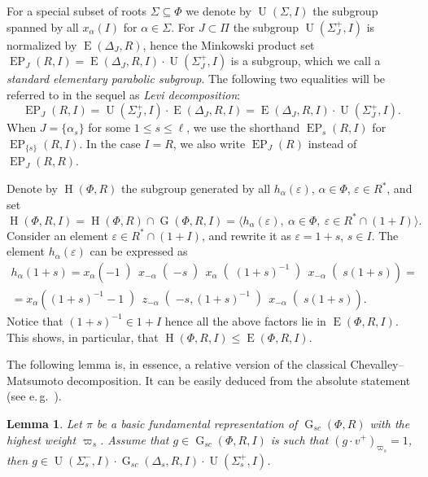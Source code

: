 \documentclass[11pt]{amsart}
\theoremstyle{plain}
\numberwithin{equation}{section}
\newtheorem{lemma}{Lemma}
\numberwithin{lemma}{section}
\theoremstyle{definition}
\theoremstyle{remark}
\DeclareMathOperator{\G}{G}
\DeclareMathOperator{\E}{E}
\DeclareMathOperator{\EP}{EP}
\DeclareMathOperator{\Hh}{H}
\DeclareMathOperator{\U}{U}
\begin{document}
For a special subset of roots $\Sigma\subseteq \Phi$ we denote by $\U(\Sigma, I)$ the subgroup spanned by all $x_{\alpha}(I)$ for $\alpha\in \Sigma$. 
For $J\subset\Pi$ the subgroup $\U(\Sigma_J^+, I)$ is normalized by $\E(\Delta_J, R)$, hence the Minkowski product set $\EP_J(R, I) = \E(\Delta_J, R, I) \cdot \U(\Sigma_J^+, I)$ is a subgroup, which we call a \emph{standard elementary parabolic subgroup}.
The following two equalities will be referred to in the sequel as \emph{Levi decomposition}:
\begin{equation} \label{rel:Levi-decomp} \EP_J(R, I) = \U(\Sigma_J^+, I) \cdot \E(\Delta_J, R, I) = \E(\Delta_J, R, I) \cdot \U(\Sigma_J^+, I). \end{equation}
When $J = \{ \alpha_s \}$ for some $1 \leq s\leq \ell$, we use the shorthand $\EP_s(R, I)$ for $\EP_{\{s\}}(R, I)$.
In the case $I=R$, we also write $\EP_J(R)$ instead of $\EP_J(R, R)$.

Denote by $\Hh(\Phi, R)$ the subgroup generated by all $h_\alpha(\varepsilon)$, $\alpha\in\Phi$, $\varepsilon\in R^*$, and set
\[ \Hh(\Phi, R, I) = \Hh(\Phi, R)\cap\G(\Phi, R, I)=\langle h_\alpha(\varepsilon), \ \alpha\in\Phi, \ \varepsilon\in R^*\cap(1+I)\rangle. \]
Consider an element $\varepsilon\in R^*\cap(1+I)$, and rewrite it as $\varepsilon=1+s$, $s\in I$. The element $h_\alpha(\varepsilon)$ can be expressed as
\begin{multline} \label{eq:rel-tor-elementary}
h_\alpha(1+s) = x_\alpha\left(-1\middle)\, x_{-\alpha}\middle(-s\middle)\, x_\alpha\middle((1+s)^{-1}\middle)\, x_{-\alpha}\middle(s(1+s)\right) = \\
= x_\alpha\left((1+s)^{-1}-1\middle)\, z_{-\alpha}\middle(-s, (1+s)^{-1}\middle)\, x_{-\alpha}\middle(s(1+s)\right).
\end{multline}
Notice that $(1+s)^{-1}\in 1+I$ hence all the above factors lie in $\E(\Phi, R, I)$. 
 This shows, in particular, that $\Hh(\Phi, R, I) \leqslant \E(\Phi, R, I)$.

The following lemma is, in essence, a relative version of the classical Chevalley--Matsumoto decomposition.
It can be easily deduced from the absolute statement (see e.\,g.~\cite[Theorem~1.3]{St78}).
\begin{lemma}\label{lemma:Chevalley-Matsumoto}
Let $\pi$ be a basic fundamental representation of $\G_{sc}(\Phi, R)$ with the highest weight $\varpi_s$.
Assume that $g\in \G_{sc}(\Phi, R, I)$ is such that $(g\cdot v^+)_{\varpi_{s}}=1$, then $g \in \U(\Sigma_s^-, I) \cdot \G_{sc}(\Delta_s, R, I) \cdot \U(\Sigma_s^+, I)$.
\end{lemma}
\end{document}
